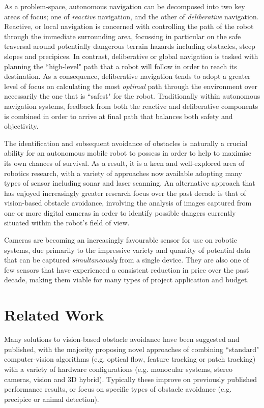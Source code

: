 As a problem-space, autonomous navigation can be decomposed into two key areas of focus; one of \textit{reactive} navigation, and the other of \textit{deliberative} navigation. Reactive, or local navigation is concerned with controlling the path of the robot through the immediate surrounding area, focussing in particular on the safe traversal around potentially dangerous terrain hazards including obstacles, steep slopes and precipices. In contrast, deliberative or global navigation is tasked with planning the ``high-level" path that a robot will follow in order to reach its destination. As a consequence, deliberative navigation tends to adopt a greater level of focus on calculating the most \textit{optimal} path through the environment over necessarily the one that is ``safest" for the robot. Traditionally within autonomous navigation systems, feedback from both the reactive and deliberative components is combined in order to arrive at final path that balances both safety and objectivity. 

The identification and subsequent avoidance of obstacles is naturally a crucial ability for an autonomous mobile robot to possess in order to help to maximise its own chances of survival. As a result, it is a keen and well-explored area of robotics research, with a variety of approaches now available adopting many types of sensor including sonar and laser scanning. An alternative approach that has enjoyed increasingly greater research focus over the past decade is that of vision-based obstacle avoidance, involving the analysis of images captured from one or more digital cameras in order to identify possible dangers currently situated within the robot's field of view. 

Cameras are becoming an increasingly favourable sensor for use on robotic systems, due primarily to the impressive variety and quantity of potential data that can be captured \textit{simultaneously} from a single device. They are also one of few sensors that have experienced a consistent reduction in price over the past decade, making them viable for many types of project application and budget. 


\section{Related Work}

Many solutions to vision-based obstacle avoidance have been suggested and published, with the majority proposing novel approaches of combining ``standard" computer-vision algorithms (e.g. optical flow, feature tracking or patch tracking) with a variety of hardware configurations (e.g. monocular systems, stereo cameras, vision and 3D hybrid). Typically these improve on previously published performance results, or focus on specific types of obstacle avoidance (e.g. precipice or animal detection).

